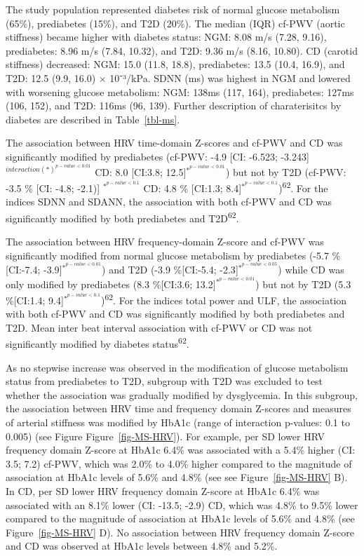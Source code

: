 \documentclass[
  a4paper,
  headsepline=true,
  open=any]{scrbook}
\begin{document}
The study population represented diabetes risk of normal glucose
metabolism (65\%), prediabetes (15\%), and T2D (20\%). The median (IQR)
cf-PWV (aortic stiffness) became higher with diabetes status: NGM: 8.08
m/s (7.28, 9.16), prediabetes: 8.96 m/s (7.84, 10.32), and T2D: 9.36 m/s
(8.16, 10.80). CD (carotid stiffness) decreased: NGM: 15.0 (11.8, 18.8),
prediabetes: 13.5 (10.4, 16.9), and T2D: 12.5 (9.9, 16.0) × 10⁻³/kPa.
SDNN (ms) was highest in NGM and lowered with worsening glucose
metabolism: NGM: 138ms (117, 164), prediabetes: 127ms (106, 152), and
T2D: 116ms (96, 139). Further description of charaterisitcs by diabetes
are described in Table~\ref{tbl-ms}.

The association between HRV time-domain Z-scores and cf-PWV and CD was
significantly modified by prediabetes (cf-PWV: -4.9 {[}CI: -6.523;
-3.243{]} \(^{interaction(*) ^{p-value< 0.01}}\) CD: 8.0 {[}CI:3.8;
12.5{]}\(^{*^{p-value< 0.01}}\)) but not by T2D (cf-PWV: -3.5 \% {[}CI:
-4.8; -2.1){]} \(^{*^{p-value< 0.1}}\) CD: 4.8 \% {[}CI:1.3;
8.4{]}\(^{*^{p-value< 0.1}}\))\textsuperscript{62}. For the indices SDNN
and SDANN, the association with both cf-PWV and CD was significantly
modified by both prediabetes and T2D\textsuperscript{62}.

The association between HRV frequency-domain Z-score and cf-PWV was
significantly modified from normal glucose metabolism by prediabetes
(-5.7 \%{[}CI:-7.4; -3.9{]}\(^{*^{p-value< 0.01}}\)) and T2D (-3.9
\%{[}CI:-5.4; -2.3{]}\(^{*^{p-value< 0.05}}\)) while CD was only
modified by prediabetes (8.3 \%{[}CI:3.6;
13.2{]}\(^{*^{p-value< 0.01}}\)) but not by T2D (5.3 \%{[}CI:1.4;
9.4{]}\(^{*^{p-value< 0.1}}\))\textsuperscript{62}. For the indices
total power and ULF, the association with both cf-PWV and CD was
significantly modified by both prediabetes and T2D. Mean inter beat
interval association with cf-PWV or CD was not significantly modified by
diabetes status\textsuperscript{62}.

As no stepwise increase was observed in the modification of glucose
metabolism status from prediabetes to T2D, subgroup with T2D was
excluded to test whether the association was gradually modified by
dysglycemia. In this subgroup, the association between HRV time and
frequency domain Z-scores and measures of arterial stiffness was
modified by HbA1c (range of interaction p-values: 0.1 to 0.005) (see
Figure Figure~\ref{fig-MS-HRV}). For example, per SD lower HRV frequency
domain Z-score at HbA1c 6.4\% was associated with a 5.4\% higher (CI:
3.5; 7.2) cf-PWV, which was 2.0\% to 4.0\% higher compared to the
magnitude of association at HbA1c levels of 5.6\% and 4.8\% (see see
Figure~\ref{fig-MS-HRV} B). In CD, per SD lower HRV frequency domain
Z-score at HbA1c 6.4\% was associated with an 8.1\% lower (CI: -13.5;
-2.9) CD, which was 4.8\% to 9.5\% lower compared to the magnitude of
association at HbA1c levels of 5.6\% and 4.8\% (see
Figure~\ref{fig-MS-HRV} D). No association between HRV frequency domain
Z-score and CD was observed at HbA1c levels between 4.8\% and 5.2\%.
\end{document}
